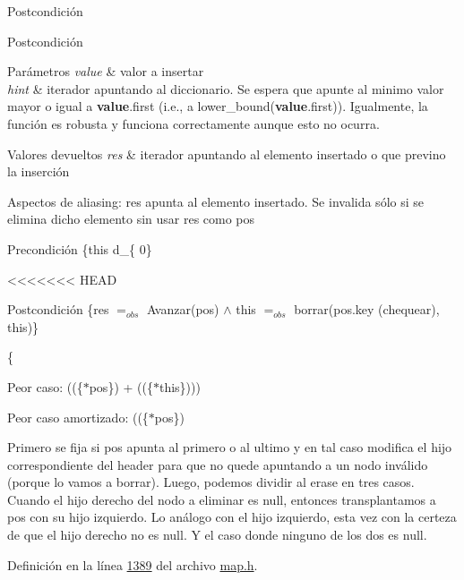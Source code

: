 \begin{DoxyPostcond}{\-Postcondición}
\begin{DoxyPostcond}{\-Postcondición}
\begin{DoxyParams}{Parámetros}
{\em value} & valor a insertar \\
\hline
{\em hint} & iterador apuntando al diccionario. Se espera que apunte al minimo valor mayor o igual a {\bfseries value}.first (i.\+e., a lower\+\_\+bound({\bfseries value}.first)). Igualmente, la función es robusta y funciona correctamente aunque esto no ocurra. \\
\hline
\end{DoxyParams}

\begin{DoxyRetVals}{Valores devueltos}
{\em res} & iterador apuntando al elemento insertado o que previno la inserción\\
\hline
\end{DoxyRetVals}
\begin{DoxyParagraph}{Aspectos de aliasing\+:}
res apunta al elemento insertado. Se invalida sólo si se elimina dicho elemento sin usar res como pos
\end{DoxyParagraph}
\begin{DoxyPrecond}{Precondición}
\{this  d\+\_\+\{ 0\} 
\end{DoxyPrecond}
<<<<<<< HEAD
\begin{DoxyPostcond}{\-Postcondición}
\{res $=_{obs}$ \-Avanzar(pos) $\land$ this $=_{obs}$ borrar(pos.\-key (chequear), this)\}
\end{DoxyPostcond}
\{
\begin{DoxyItemize}
\item \-Peor caso\-: ((\{$\ast$pos\}) + ((\{$\ast$this\})))
\item \-Peor caso amortizado\-: ((\{$\ast$pos\})
\end{DoxyItemize}

\-Primero se fija si pos apunta al primero o al ultimo y en tal caso modifica el hijo correspondiente del header para que no quede apuntando a un nodo inválido (porque lo vamos a borrar). \-Luego, podemos dividir al erase en tres casos. \-Cuando el hijo derecho del nodo a eliminar es null, entonces transplantamos a pos con su hijo izquierdo. \-Lo análogo con el hijo izquierdo, esta vez con la certeza de que el hijo derecho no es null. \-Y el caso donde ninguno de los dos es null. 

\-Definición en la línea \hyperlink{map_8h_source_l01389}{1389} del archivo \hyperlink{map_8h_source}{map.\-h}.

\hypertarget{classaed2_1_1map_a98b9f200c64ce02dfb67902ee00e375a_a98b9f200c64ce02dfb67902ee00e375a}{
}
\end{DoxyPostcond}
\end{DoxyPostcond}
